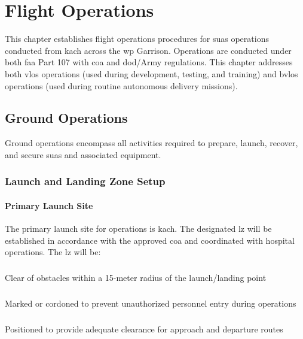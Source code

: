 \chapter{Flight Operations}
\label{ch:flightops}

This chapter establishes flight operations procedures for \projectmars{} \ac{suas} operations conducted from \ac{kach} across the \ac{wp} Garrison. Operations are conducted under both \ac{faa} Part 107 with \ac{coa} and \ac{dod}/Army regulations. This chapter addresses both \ac{vlos} operations (used during development, testing, and training) and \ac{bvlos} operations (used during routine autonomous delivery missions).

\section{Ground Operations}\label{sec:groundops}

Ground operations encompass all activities required to prepare, launch, recover, and secure \projectmars{} \ac{suas} and associated equipment.

    \subsection{Launch and Landing Zone Setup}\label{ssec:lzsetup}

        \subsubsection{Primary Launch Site} The primary launch site for \projectmars{} operations is \ac{kach}. The designated \ac{lz} will be established in accordance with the approved \ac{coa} and coordinated with hospital operations. The \ac{lz} will be:

            \paragraph{} Clear of obstacles within a 15-meter radius of the launch/landing point
            \paragraph{} Marked or cordoned to prevent unauthorized personnel entry during operations
            \paragraph{} Positioned to provide adequate clearance for approach and departure routes

